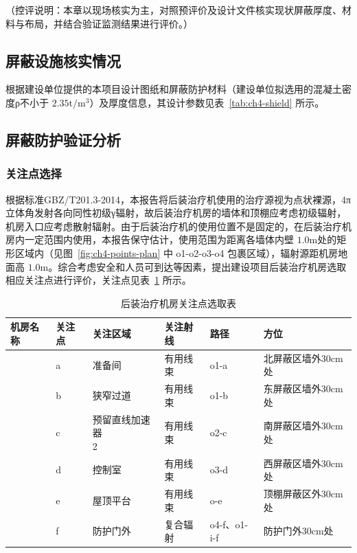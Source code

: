（控评说明：本章以现场核实为主，对照预评价及设计文件核实现状屏蔽厚度、材料与布局，并结合验证监测结果进行评价。）


\subsection{屏蔽设施核实情况}

根据建设单位提供的本项目设计图纸和屏蔽防护材料（建设单位拟选用的混凝土密度ρ不小于 $2 . 3 5 \mathrm { t } / \mathrm { m } ^ { 3 }$）及厚度信息，其设计参数见表~\ref{tab:ch4-shield} 所示。





\subsection{屏蔽防护验证分析}

\subsubsection{关注点选择}

根据标准GBZ/T201.3-2014，本报告将后装治疗机使用的治疗源视为点状裸源，4π立体角发射各向同性初级γ辐射，故后装治疗机房的墙体和顶棚应考虑初级辐射，机房入口应考虑散射辐射。由于后装治疗机的使用位置不是固定的，在后装治疗机房内一定范围内使用，本报告保守估计，使用范围为距离各墙体内壁 $1 . 0 \mathrm { m }$处的矩形区域内（见图~\ref{fig:ch4-points-plan} 中 o1-o2-o3-o4 包裹区域），辐射源距机房地面高 $1 . 0 \mathrm { m }$。综合考虑安全和人员可到达等因素，提出建设项目后装治疗机房选取相应关注点进行评价，关注点见表~\ref{tab:ch4-points} 所示。


\begin{table}[H]
\centering
\caption{后装治疗机房关注点选取表}
\label{tab:ch4-points}
\setlength{\tabcolsep}{4pt}
\begin{tabular}{|
>{\centering\arraybackslash}m{1.2cm}|
>{\centering\arraybackslash}m{1.0cm}|
>{\centering\arraybackslash}m{3.6cm}|
>{\centering\arraybackslash}m{1.8cm}|
>{\centering\arraybackslash}m{1.2cm}|
>{\centering\arraybackslash}m{5.2cm}|
}
\hline
机房名称 & 关注点 & 关注区域 & 关注射线 & 路径 & 方位 \\
\hline
\multirow{6}{=}{\centering 后装治疗机房}
& a & 准备间 & 有用线束 & o1-a & 北屏蔽区墙外30cm处 \\
\cline{2-6}
& b & 狭窄过道 & 有用线束 & o1-b & 东屏蔽区墙外30cm处 \\
\cline{2-6}
& c & \makecell{预留直线加速器\\2} & 有用线束 & o2-c & 南屏蔽区墙外30cm处 \\
\cline{2-6}
& d & 控制室 & 有用线束 & o3-d & 西屏蔽区墙外30cm处 \\
\cline{2-6}
& e & 屋顶平台 & 有用线束 & o-e & 顶棚屏蔽区外30cm处 \\
\cline{2-6}
& f & 防护门外 & 复合辐射 & o4-f、o1-i-f & 防护门外30cm处 \\
\hline
\end{tabular}
\end{table}


